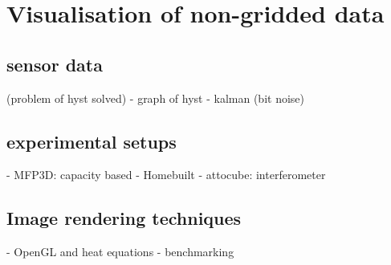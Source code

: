 \chapter{Visualisation of non-gridded data}

\section{sensor data}

(problem of hyst solved)
	- graph of hyst
	- kalman (bit noise)

\section{experimental setups}
	- MFP3D: capacity based
	- Homebuilt
		- attocube: interferometer

\section{Image rendering techniques}
- OpenGL and heat equations
	- benchmarking